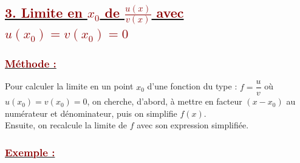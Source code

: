 \documentclass[12pt,a4paper]{article}
\begin{document}
\subsection*{\underline{\textcolor{darkred}{3. Limite en $x_0$ de $\frac{u(x)}{v(x)}$ avec $u(x_0)=v(x_0)=0$}}}

\subsubsection*{\underline{\textcolor{darkred}{ Méthode : }}}

Pour calculer la limite en un point $x_0$ d'une fonction du type : $f = \dfrac{u}{v}$ où $u(x_0) = v(x_0) = 0$, on cherche, d'abord, à mettre en facteur $(x - x_0)$ au numérateur et dénominateur, puis on simplifie $f(x)$. \\
Ensuite, on recalcule la limite de $f$ avec son expression simplifiée.

\subsubsection*{\underline{\textcolor{darkred}{ Exemple : }}}

\vspace{0.3cm}
\end{document}
